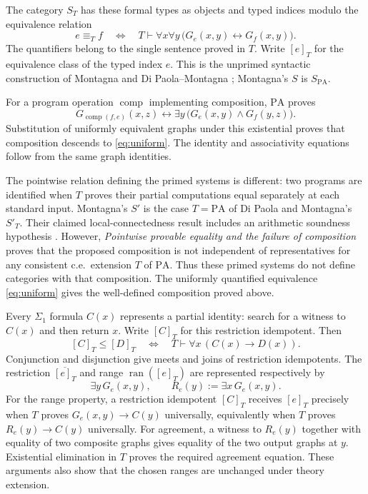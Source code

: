 \documentclass[11pt]{article}
\newcommand{\PA}{\mathrm{PA}}
\newcommand{\ran}{\operatorname{ran}}
\begin{document}
The category $S_T$ has these formal types as objects and typed indices
modulo the equivalence relation
\begin{equation}\label{eq:uniform}
 e\equiv_T f
 \quad\Longleftrightarrow\quad
 T\vdash \forall x\forall y\,
       \bigl(G_e(x,y)\leftrightarrow G_f(x,y)\bigr).
\end{equation}
The quantifiers belong to the single sentence proved in $T$.
Write $[e]_T$ for the equivalence class of the typed index $e$.
This is the unprimed syntactic construction of Montagna and
Di Paola--Montagna \cite{Montagna,DPM}; Montagna's $S$ is $S_{\PA}$.

For a program operation $\operatorname{comp}$ implementing composition,
$\PA$ proves
\begin{equation}\label{eq:composition}
 G_{\operatorname{comp}(f,e)}(x,z)
 \leftrightarrow
 \exists y\,\bigl(G_e(x,y)\land G_f(y,z)\bigr).
\end{equation}
Substitution of uniformly equivalent graphs under this existential proves
that composition descends to \eqref{eq:uniform}. The identity and
associativity equations follow from the same graph identities.

The pointwise relation defining the primed systems is different:
two programs are identified when $T$ proves their partial computations
equal separately at each standard input. Montagna's $S'$ is the case
$T=\PA$ of Di Paola and Montagna's $S'_T$. Their claimed
local-connectedness result includes an arithmetic soundness hypothesis
\cite[Theorem 4.5, pp.~658--659]{DPM}. However,
\emph{Pointwise provable equality and the failure of composition}
\cite[Corollary 2]{Composition} proves that the proposed composition
is not independent of representatives for any consistent c.e.\
extension $T$ of $\PA$. Thus these primed systems do not define
categories with that composition. The uniformly quantified equivalence
\eqref{eq:uniform} gives the well-defined composition proved above.

Every $\Sigma_1$ formula $C(x)$ represents a partial identity: search for
a witness to $C(x)$ and then return $x$. Write $[C]_T$ for this
restriction idempotent.
Then
\begin{equation}\label{eq:domain-order}
 [C]_T\le[D]_T
 \quad\Longleftrightarrow\quad
 T\vdash\forall x\,(C(x)\longrightarrow D(x)).
\end{equation}
Conjunction and disjunction give meets and joins of restriction
idempotents. The restriction $\overline{[e]_T}$ and range $\ran([e]_T)$
are represented respectively by
\[
 \exists y\,G_e(x,y),\qquad
 R_e(y):=\exists x\,G_e(x,y).
\]
For the range property, a restriction idempotent $[C]_T$ receives
$[e]_T$ precisely when
$T$ proves $G_e(x,y)\to C(y)$ universally, equivalently when
$T$ proves $R_e(y)\to C(y)$ universally. For agreement, a witness to
$R_e(y)$ together with equality of two composite graphs gives equality
of the two output graphs at $y$. Existential elimination in $T$ proves
the required agreement equation. These arguments also show that the
chosen ranges are unchanged under theory extension.
\end{document}
